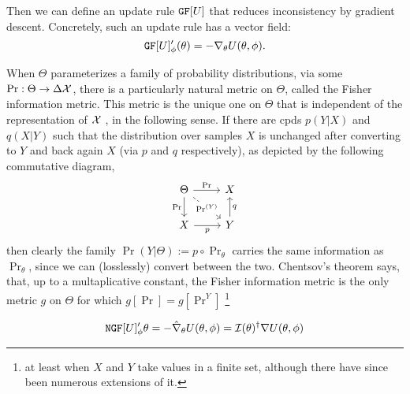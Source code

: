 \documentclass{article}
\begin{document}
Then we can define an update rule $\mathtt{GF}[U]$ that reduces inconsistency by gradient descent. Concretely, such an update rule has a vector field:
\[
    \mathtt{GF}[U]'_\phi(\theta) = - \nabla_\theta U(\theta,\phi).
\]

When $\Theta$ parameterizes a family of probability distributions, via some $\Pr : \Theta \to \Delta \mathcal X$, there is a particularly natural metric on $\Theta$, called the Fisher information metric.
This metric is the unique one on $\Theta$ that is 
independent of the representation of $\mathcal X$ \parencite{chentsov}, in the following sense.
If there are cpds $p(Y|X)$ and $q(X|Y)$ such that
the distribution over samples $X$ is unchanged after converting to $Y$ and back again $X$ (via $p$ and $q$ respectively), as depicted by the following commutative diagram,
\[
    \begin{tikzcd}
        \Theta \ar[r,"\Pr"]\ar[d,"\Pr"']
            \ar[rd,dashed,"\Pr^{(Y)}"description]& X \\
        X \ar[r,"p"'] & Y \ar[u, "q"']
    \end{tikzcd}
\]
then clearly the family $\Pr(Y|\Theta) := p\circ\Pr_{\theta}$ carries the same information as $\Pr_\theta$, since we can (losslessly) convert between the two. 
Chentsov's theorem says, that, up to a multaplicative constant, the Fisher information metric is the only metric $g$ on $\Theta$ for which 
$g[\Pr] = g[\Pr^{Y}]$
\footnote{at least when $X$ and $Y$ take values in a finite set, although there have since been numerous extensions of it.}


\[ 
    \mathtt{NGF}[U]'_\phi \theta = - \hat \nabla_\theta U(\theta,\phi)
        = \mathcal I(\theta)^{\dagger}  \nabla U(\theta, \phi)
\] 
\end{document}
